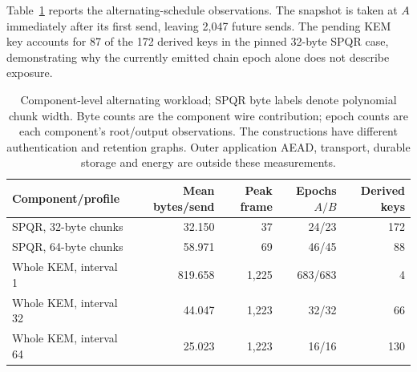 \documentclass[pdflatex]{sn-jnl}
\theoremstyle{thmstyleone}
\theoremstyle{thmstylethree}
\theoremstyle{thmstyletwo}
\begin{document}
Table~\ref{tab:reference} reports the alternating-schedule
observations. The snapshot is taken at $A$ immediately after its first send,
leaving 2,047 future sends. The pending KEM key accounts for 87 of the 172
derived keys in the pinned 32-byte SPQR case, demonstrating why the currently
emitted chain epoch alone does not describe exposure.

\begin{table}[t]
\centering
\small
\begin{tabular}{@{}lrrrr@{}}
\toprule
Component/profile & Mean bytes/send & Peak frame & Epochs $A/B$ & Derived keys\\
\midrule
SPQR, 32-byte chunks & 32.150 & 37 & 24/23 & 172\\
SPQR, 64-byte chunks & 58.971 & 69 & 46/45 & 88\\
Whole KEM, interval 1 & 819.658 & 1,225 & 683/683 & 4\\
Whole KEM, interval 32 & 44.047 & 1,223 & 32/32 & 66\\
Whole KEM, interval 64 & 25.023 & 1,223 & 16/16 & 130\\
\bottomrule
\end{tabular}
\caption{Component-level alternating workload; SPQR byte labels denote polynomial chunk width. Byte counts are the
component wire contribution; epoch counts are each component's root/output
observations. The constructions have different authentication and retention
graphs. Outer application AEAD, transport, durable storage and energy are
outside these measurements.}
\label{tab:reference}
\end{table}
\end{document}
